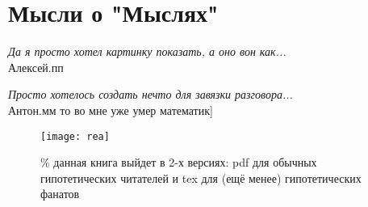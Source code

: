\section*{Мысли о "Мыслях"}

\emph{Да я просто хотел картинку показать, а оно вон как...}\\
Алексей.пп %


\emph{Просто хотелось создать нечто для завязки разговора...}\\
Антон.мм %
то во мне уже умер математик]

\begin{figure}[ht!]
    \centering
    \texttt{[image: rea]}
    \caption{\% данная книга выйдет в 2-х версиях: pdf для обычных гипотетических читателей и tex для (ещё менее) гипотетических фанатов}
\end{figure}
